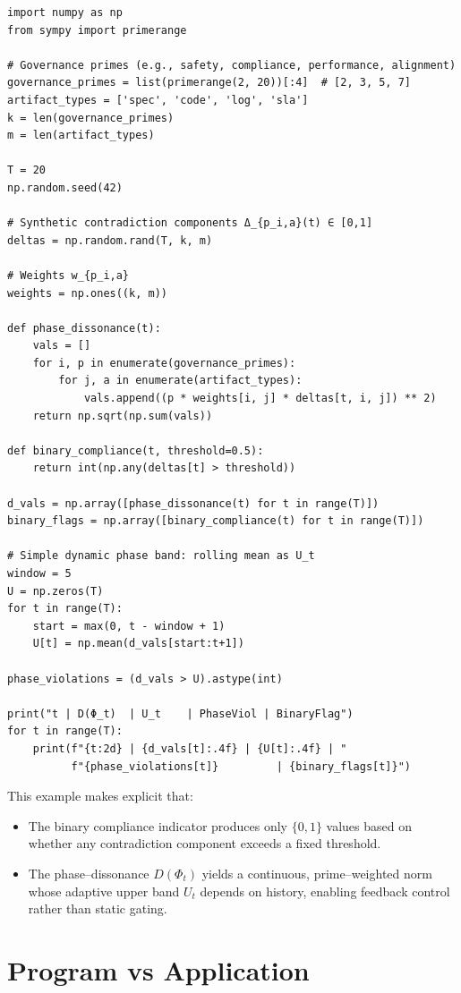 \documentclass[11pt]{article}
\begin{document}
\begin{verbatim}
import numpy as np
from sympy import primerange

# Governance primes (e.g., safety, compliance, performance, alignment)
governance_primes = list(primerange(2, 20))[:4]  # [2, 3, 5, 7]
artifact_types = ['spec', 'code', 'log', 'sla']
k = len(governance_primes)
m = len(artifact_types)

T = 20
np.random.seed(42)

# Synthetic contradiction components Δ_{p_i,a}(t) ∈ [0,1]
deltas = np.random.rand(T, k, m)

# Weights w_{p_i,a}
weights = np.ones((k, m))

def phase_dissonance(t):
    vals = []
    for i, p in enumerate(governance_primes):
        for j, a in enumerate(artifact_types):
            vals.append((p * weights[i, j] * deltas[t, i, j]) ** 2)
    return np.sqrt(np.sum(vals))

def binary_compliance(t, threshold=0.5):
    return int(np.any(deltas[t] > threshold))

d_vals = np.array([phase_dissonance(t) for t in range(T)])
binary_flags = np.array([binary_compliance(t) for t in range(T)])

# Simple dynamic phase band: rolling mean as U_t
window = 5
U = np.zeros(T)
for t in range(T):
    start = max(0, t - window + 1)
    U[t] = np.mean(d_vals[start:t+1])

phase_violations = (d_vals > U).astype(int)

print("t | D(Φ_t)  | U_t    | PhaseViol | BinaryFlag")
for t in range(T):
    print(f"{t:2d} | {d_vals[t]:.4f} | {U[t]:.4f} | "
          f"{phase_violations[t]}         | {binary_flags[t]}")
\end{verbatim}

This example makes explicit that:
\begin{itemize}
  \item The binary compliance indicator produces only $\{0,1\}$ values based on whether any contradiction component exceeds a fixed threshold.
  \item The phase--dissonance $D(\Phi_t)$ yields a continuous, prime--weighted norm whose adaptive upper band $U_t$ depends on history, enabling feedback control rather than static gating.
\end{itemize}

\section{Program vs Application}
\end{document}

